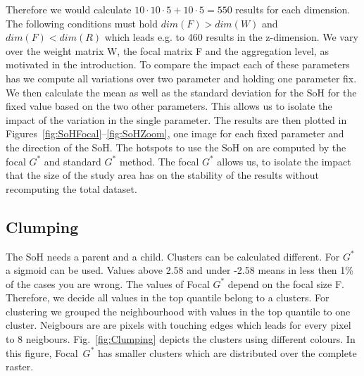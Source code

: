 \documentclass{itatnew}
\begin{document}
Therefore we would calculate $10 \cdot 10 \cdot 5 + 10 \cdot 5=550$ results for each dimension.
The following conditions must hold $dim(F) > dim(W)$ and $dim(F) < dim(R)$ 
which leads e.g. to 460 results in the z-dimension.
We vary over the weight matrix W, the focal matrix F and the aggregation level, as motivated in the introduction.
To compare the impact each of these parameters has we compute all variations 
over two parameter and holding one parameter fix. We then calculate the mean as 
well as the standard deviation for the SoH for the fixed value based on the two 
other parameters. This allows us to isolate the impact of the variation in the 
single parameter. The results are then plotted in 
Figures~\ref{fig:SoHFocal}--\ref{fig:SoHZoom}, one image for each fixed 
parameter and the direction of the SoH.
The hotspots to use the SoH on are computed by the focal $G^*$ and standard $G^*$ method. The focal $G^*$ allows us, to isolate the impact that the size of the study area has on the stability of the results without recomputing the total dataset. 
\subsection{Clumping}

The SoH needs a parent and a child. Clusters can be calculated different. For
$G^*$ a sigmoid can be used. Values above 2.58 and under -2.58 means in less
then 1\% of the cases you are wrong. The values of Focal $G^*$ depend on the
focal size F. Therefore, we decide all values in the top quantile belong to a
clusters. For clustering we grouped the neighbourhood with values in the top
quantile to one cluster. Neigbours are are pixels with touching edges which
leads for every pixel to 8 neigbours. Fig.~\ref{fig:Clumping} depicts the 
clusters using different colours. In this figure, Focal~$G^*$ has smaller 
clusters which are distributed over the complete raster.
\end{document}

